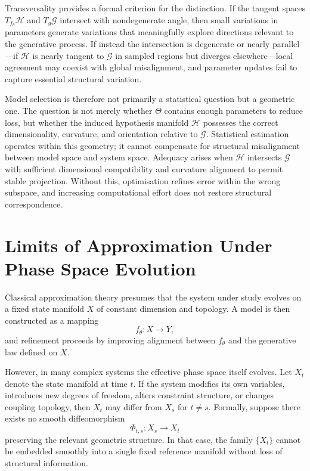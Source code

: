 \documentclass[12pt]{book}
\begin{document}
Transversality provides a formal criterion for the distinction. If the tangent
spaces $T_{f_\theta}\mathcal{H}$ and $T_g\mathcal{G}$ intersect with
nondegenerate angle, then small variations in parameters generate variations
that meaningfully explore directions relevant to the generative process. If
instead the intersection is degenerate or nearly parallel---if $\mathcal{H}$
is nearly tangent to $\mathcal{G}$ in sampled regions but diverges elsewhere---local agreement may coexist with global misalignment, and parameter updates
fail to capture essential structural variation.

Model selection is therefore not primarily a statistical question but a
geometric one. The question is not merely whether $\Theta$ contains enough
parameters to reduce loss, but whether the induced hypothesis manifold
$\mathcal{H}$ possesses the correct dimensionality, curvature, and orientation
relative to $\mathcal{G}$. Statistical estimation operates within this
geometry; it cannot compensate for structural misalignment between model space
and system space. Adequacy arises when $\mathcal{H}$ intersects $\mathcal{G}$
with sufficient dimensional compatibility and curvature alignment to permit
stable projection. Without this, optimisation refines error within the wrong
subspace, and increasing computational effort does not restore structural
correspondence.

\section{Limits of Approximation Under Phase Space Evolution}

Classical approximation theory presumes that the system under study evolves on a fixed state manifold $X$ of constant dimension and topology. A model is then constructed as a mapping
\[
f_\theta : X \to Y,
\]
and refinement proceeds by improving alignment between $f_\theta$ and the generative law defined on $X$.

However, in many complex systems the effective phase space itself evolves. Let $X_t$ denote the state manifold at time $t$. If the system modifies its own variables, introduces new degrees of freedom, alters constraint structure, or changes coupling topology, then $X_t$ may differ from $X_s$ for $t \neq s$. Formally, suppose there exists no smooth diffeomorphism
\[
\Phi_{t,s} : X_s \to X_t
\]
preserving the relevant geometric structure. In that case, the family $\{X_t\}$ cannot be embedded smoothly into a single fixed reference manifold without loss of structural information.
\end{document}
